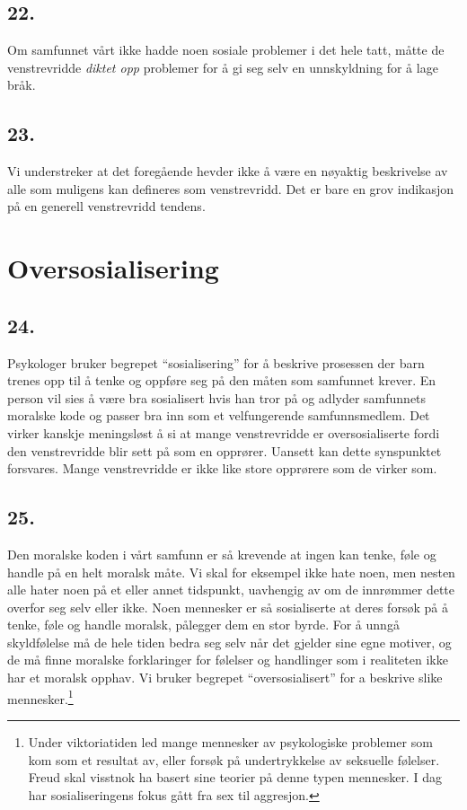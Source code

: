 \documentclass[oneside]{book}
\begin{document}
\section*{22.}
Om samfunnet vårt ikke hadde noen sosiale problemer i det hele tatt, måtte de
venstrevridde {\em diktet opp} problemer for å gi seg selv en unnskyldning for 
å lage bråk.

\section*{23.}
Vi understreker at det foregående hevder ikke å være en nøyaktig beskrivelse av
alle som muligens kan defineres som venstrevridd. Det er bare en grov
indikasjon på en generell venstrevridd tendens.

\chapter{Oversosialisering}
\section*{24.}
Psykologer bruker begrepet ``sosialisering'' for å beskrive prosessen der barn
trenes opp til å tenke og oppføre seg på den måten som samfunnet krever. En
person vil sies å være bra sosialisert hvis han tror på og adlyder samfunnets
moralske kode og passer bra inn som et velfungerende samfunnsmedlem. Det virker
kanskje meningsløst å si at mange venstrevridde er oversosialiserte fordi den
venstrevridde blir sett på som en opprører. Uansett kan dette synspunktet
forsvares. Mange venstrevridde er ikke like store opprørere som de virker som.

\section*{25.}
Den moralske koden i vårt samfunn er så krevende at ingen kan tenke, føle og
handle på en helt moralsk måte. Vi skal for eksempel ikke hate noen, men nesten
alle hater noen på et eller annet tidspunkt, uavhengig av om de innrømmer dette
overfor seg selv eller ikke. Noen mennesker er så sosialiserte at deres forsøk
på å tenke, føle og handle moralsk, pålegger dem en stor byrde. For å unngå
skyldfølelse må de hele tiden bedra seg selv når det gjelder sine egne motiver,
og de må finne moralske forklaringer for følelser og handlinger som i
realiteten ikke har et moralsk opphav. Vi bruker begrepet ``oversosialisert''
for a beskrive slike mennesker.\footnote{Under viktoriatiden led mange
mennesker av psykologiske problemer som kom som et resultat av, eller forsøk på
undertrykkelse av seksuelle følelser. Freud skal visstnok ha basert sine
teorier på denne typen mennesker. I dag har sosialiseringens fokus gått fra sex
til aggresjon.}
\end{document}
